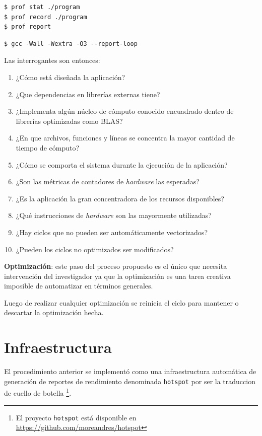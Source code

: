 \documentclass[a4paper]{report}
\begin{document}
\begin{lstlisting}[caption={Generación de Perfil de Sistema},label={lst:profall}]
$ prof stat ./program
$ prof record ./program
$ prof report
\end{lstlisting}

\begin{lstlisting}[caption={Información de Vectorización},label={lst:report}]
$ gcc -Wall -Wextra -O3 --report-loop
\end{lstlisting}

Las interrogantes son entonces:

\begin{enumerate}
\item ¿Cómo está diseñada la aplicación?
\item ¿Que dependencias en librerías externas tiene?
\item ¿Implementa algún núcleo de cómputo conocido encuadrado dentro de librerías optimizadas como BLAS?
\item ¿En que archivos, funciones y líneas se concentra la mayor cantidad de tiempo de cómputo?
\item ¿Cómo se comporta el sistema durante la ejecución de la aplicación?
\item ¿Son las métricas de contadores de {\it hardware} las esperadas?
\item ¿Es la aplicación la gran concentradora de los recursos disponibles?
\item ¿Qué instrucciones de {\it hardware} son las mayormente utilizadas?
\item ¿Hay ciclos que no pueden ser automáticamente vectorizados?
\item ¿Pueden los ciclos no optimizados ser modificados?
\end{enumerate}

\bigskip

{\bf Optimización}: este paso del proceso propuesto es el único que necesita intervención del investigador ya que la optimización es una tarea creativa imposible de automatizar en términos generales.

\bigskip

Luego de realizar cualquier optimización se reinicia el ciclo para mantener o descartar la optimización hecha.

\section{Infraestructura}

El procedimiento anterior se implementó como una infraestructura automática de generación de reportes de rendimiento denominada 
{\tt hotspot} por ser la traduccion de cuello de botella \footnote{El proyecto {\tt hotspot} está disponible en \href{https://github.com/moreandres/hotspot}{https://github.com/moreandres/hotspot}}.
\end{document}
